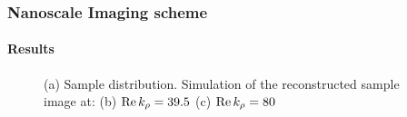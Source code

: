 \documentclass[mathserif,18pt,xcolor=table,c]{beamer}
\begin{document}
  \setcounter{subfigure}{0}%
  \begin{frame}[t]
    \frametitle{Nanoscale Imaging scheme}
    \framesubtitle{Results}
    \begin{figure}[!htbp] \vspace*{-1cm} \centering \hspace*{-.25cm}
      \caption{(a) Sample distribution. Simulation of the reconstructed sample image at: (b) $\Re k_{\rho} = 39.5$ (c) $\Re k_{\rho} = 80$}
      \label{fig:simulation}
    \end{figure}
  \end{frame}
\end{document}
